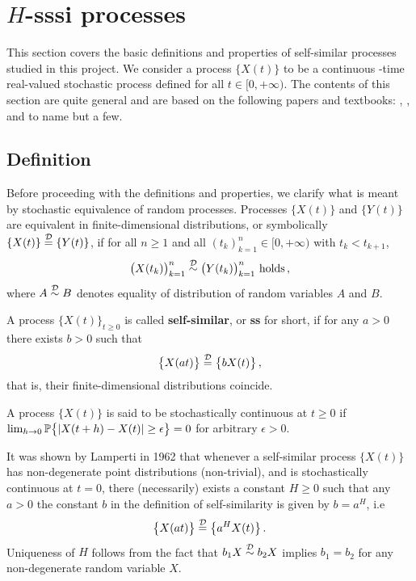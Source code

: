 \chapter{$H$-sssi processes} %
\label{cha:h_sssi_processes}

This section covers the basic definitions and properties of self-similar processes
studied in this project. We consider a process $\bigl\{X(t)\bigr\}$ to be a continuous
-time real-valued stochastic process defined for all $t\in [0,+\infty)$. The contents
of this section are quite general and are based on the following papers and textbooks:
\cite{bulinskii2005teoriya2516755}, \cite{Bai20141710}, \cite{Chronopoulou:1114288}
\cite{embrechts2000introduction} and \cite{embrechtsselfsimilar} to name but a few.

\section{Definition} %
\label{sec:definition}

Before proceeding with the definitions and properties, we clarify what is meant by
stochastic equivalence of random processes. Processes $\bigl\{X(t)\bigr\}$ and
$\bigl\{Y(t)\bigr\}$ are equivalent in finite-dimensional distributions, or symbolically
$\{X(t)\} \overset{\mathcal{D}}{=} \{Y(t)\}$, if for all $n\geq1$ and all $(t_k)_{k=1}^n\in [0,+\infty)$
with $t_k<t_{k+1}$,
\[ \bigl(X(t_k)\bigr)_{k=1}^n \overset{\mathcal{D}}{\sim} \bigl(Y(t_k)\bigr)_{k=1}^n \text{ holds}\,,\]
where $A\overset{\mathcal{D}}{\sim} B$ denotes equality of distribution of random variables
$A$ and $B$.

A process $\bigl\{X(t)\bigr\}_{t\geq 0}$ is called \textbf{self-similar}, or \textbf{ss}
for short, if for any $a>0$ there exists $b>0$ such that
\[ \bigl\{X(at)\bigr\} \overset{\mathcal{D}}{=} \bigl\{b X(t)\bigr\} \,,\]
that is, their finite-dimensional distributions coincide.

A process $\bigl\{X(t)\bigr\}$ is said to be stochastically continuous at $t\geq0$ if
$\lim_{h\to 0} \mathbb{P}\bigl\{ |X(t+h)-X(t)| \geq \epsilon \bigr\} = 0$ for arbitrary
$\epsilon > 0$.

It was shown by Lamperti in 1962 that whenever a self-similar process $\bigl\{X(t)\bigr\}$
has non-degenerate point distributions (non-trivial), and is stochastically continuous
at $t=0$, there (necessarily) exists a constant $H\geq 0$ such that any $a>0$ the constant
$b$ in the definition of self-similarity is given by $b=a^H$, i.e
\[ \bigl\{X(at)\bigr\} \overset{\mathcal{D}}{=} \bigl\{a^H X(t)\bigr\} \,. \]
Uniqueness of $H$ follows from the fact that $b_1 X\overset{\mathcal{D}}{\sim} b_2 X$ implies
$b_1=b_2$ for any non-degenerate random variable $X$.

